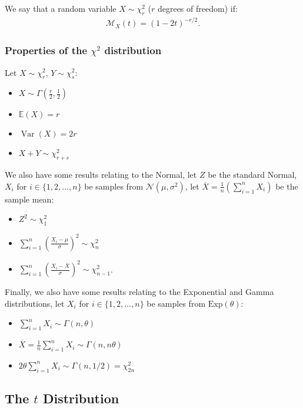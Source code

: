 \documentclass[a4paper, 12pt, twoside]{article}
\DeclareMathOperator{\Var}{Var}
\begin{document}
We say that a random variable $X \sim \chi^2_r$ ($r$ degrees of freedom)
if:
\begin{align*}
    \mathcal{M}_X(t) = (1 - 2t)^{-r / 2}.
\end{align*}

\subsubsection{Properties of the $\chi^2$ distribution}

Let $X \sim \chi^2_r$, $Y \sim \chi^2_s$:

\begin{itemize}
    \item $X \sim \Gamma(\frac{r}{2}, \frac{1}{2})$
    \item $\mathbb{E}(X) = r$
    \item $\Var(X) = 2r$
    \item $X + Y \sim \chi^2_{r + s}$
\end{itemize}

We also have some results relating to the Normal, let $Z$ be the standard
Normal, $X_i$ for $i \in \{1, 2, \ldots, n\}$ be samples from
$\mathcal{N}(\mu, \sigma^2)$, let $\overline{X} = \frac{1}{n}
    (\sum_{i = 1}^n X_i)$ be the sample mean:

\begin{itemize}
    \item $Z^2 \sim \chi^2_1$
    \item $\sum_{i = 1}^n (\frac{X_i - \mu}{\sigma})^2 \sim \chi^2_n$
    \item $\sum_{i = 1}^n (\frac{X_i - \overline{X}}{\sigma})^2 \sim \chi^2_{n-1}$.
\end{itemize}

Finally, we also have some results relating to the Exponential and Gamma
distributions, let $X_i$ for $i \in \{1, 2, \ldots, n\}$ be samples
from $\text{Exp}(\theta)$:

\begin{itemize}
    \item $\sum_{i = 1}^n X_i \sim \Gamma(n, \theta)$
    \item $\overline{X} = \frac{1}{n} \sum_{i = 1}^n X_i \sim \Gamma(n, n\theta)$
    \item $2\theta \sum_{i = 1}^n X_i \sim \Gamma(n, 1/2) = \chi^2_{2n}$
\end{itemize}

\newpage

\subsection{The $t$ Distribution}
\end{document}
